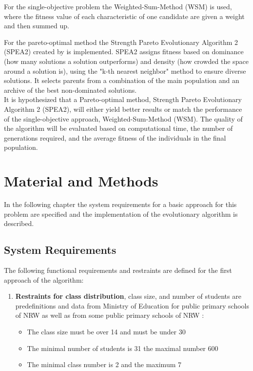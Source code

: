 \begin{onehalfspace}
For the single-objective problem the Weighted-Sum-Method (WSM) is used, where the fitness value of each characteristic
of one candidate are given a weight and then summed up.

For the pareto-optimal method the Strength Pareto Evolutionary Algorithm 2 (SPEA2) created by 
\citet{zitzler2001spea2} is 
implemented. SPEA2 assigns fitness based on dominance (how many solutions a solution outperforms)
 and density 
(how crowded the space around a solution is), using the "k-th nearest neighbor" 
method to ensure diverse solutions. It selects parents from a combination of the main 
population and an archive of the best non-dominated solutions.
\\

It is hypothesized that a Pareto-optimal method, Strength Pareto Evolutionary Algorithm 2 
(SPEA2),
 will either yield better results or match 
the performance of the single-objective approach, Weighted-Sum-Method (WSM). The quality of the algorithm will be evaluated
 based on computational time, the number of generations 
required, and the average fitness of the individuals in the final population.


\section{Material and Methods}
In the following chapter the system requirements for a basic approach for this problem are specified and the implementation of the evolutionary algorithm is described.

\subsection{System Requirements}
The following functional requirements and restraints are defined for the first approach 
of the algorithm:

\begin{enumerate}

  \item \textbf{Restraints for class distribution}, class size, and number of students are  
  predefinitions and data from Ministry of Education for public primary schools of NRW as well as 
   from some public primary schools of NRW
  \citep{Quantita2020,Klassnebildung2020} :
  
  \begin{itemize}
      \item The class size must be over 14 and must be under 30
      \item The minimal number of students is 31 the maximal number 600
      \item The minimal class number is 2 and the maximum 7
  \end{itemize}
  

\end{enumerate}
\end{onehalfspace}
